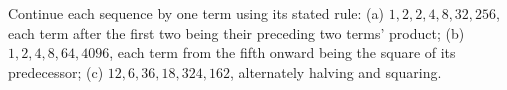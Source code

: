 Continue each sequence by one term using its stated rule: (a) $1,2,2,4,8,32,256$, each term after the first two being their preceding two terms' product; (b) $1,2,4,8,64,4096$, each term from the fifth onward being the square of its predecessor; (c) $12,6,36,18,324,162$, alternately halving and squaring.

